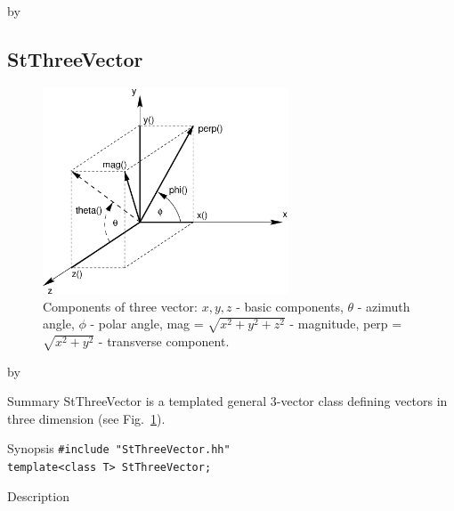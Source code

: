 \documentclass[twoside]{article}
\newcommand{\entrylabel}[1]{\mbox{\textbf{{#1}}}\hfil}%
\newenvironment{entry}
{\begin{list}{}%
    {\renewcommand{\makelabel}{\entrylabel}%
     \setlength{\labelwidth}{90pt}%
     \setlength{\leftmargin}{\labelwidth}
     \advance\leftmargin by \labelsep%
      }%
    }%
  {\end{list}}
\newcommand{\Entrylabel}[1]%
{\raisebox{0pt}[1ex][0pt]{\makebox[\labelwidth][l]%
    {\parbox[t]{\labelwidth}{\hspace{0pt}\textbf{{#1}}}}}}
\newenvironment{Entry}%
{\renewcommand{\entrylabel}{\Entrylabel}\begin{entry}}%
  {\end{entry}}
\begin{document}
\begin{description}
\begin{Entry}
\end{Entry}
\clearpage

%
%
\subsection{StThreeVector } \label{StThreeVector}
\begin{figure}[bh]
    \begin{center}
        \includegraphics[width=0.65\textwidth]{vec3.eps}
        \caption{Components of three vector: $x,y,z$ - basic components,
            $\theta$ - azimuth angle, $\phi$ - polar angle, mag =
            $\sqrt{x^2+y^2+z^2}$ - magnitude, perp = $\sqrt{x^2+y^2}$
            - transverse component.}
        \label{fig:StThreeVector}
    \end{center}    
\end{figure}

\begin{Entry}
\item[Summary]
    StThreeVector is a templated general 3-vector class defining
    vectors in three dimension (see Fig.~\ref{fig:StThreeVector}).

\item[Synopsis]
    \verb+#include "StThreeVector.hh"+ \\
    \verb+template<class T> StThreeVector;+
    
    
\item[Description]   
    

\end{Entry}
\end{description}
\end{document}

